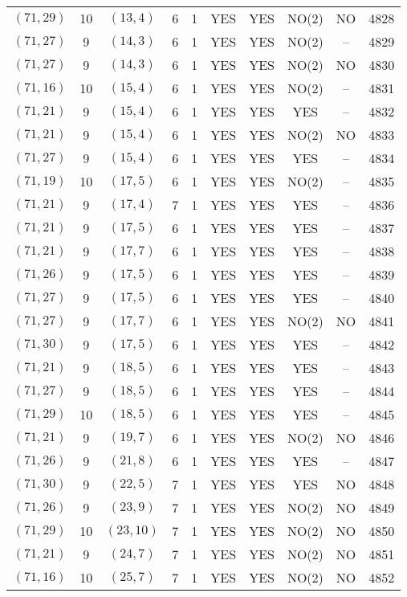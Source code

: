 \begin{longtable}{|c|c|c|c|c|c|c|c|c|c|}
$(71, 29)$ & 10 & $(13, 4)$ & 6 & 1 & YES & YES & NO(2) & NO & 4828\\
$(71, 27)$ & 9 & $(14, 3)$ & 6 & 1 & YES & YES & NO(2) & -- & 4829\\
$(71, 27)$ & 9 & $(14, 3)$ & 6 & 1 & YES & YES & NO(2) & NO & 4830\\
$(71, 16)$ & 10 & $(15, 4)$ & 6 & 1 & YES & YES & NO(2) & -- & 4831\\
$(71, 21)$ & 9 & $(15, 4)$ & 6 & 1 & YES & YES & YES & -- & 4832\\
$(71, 21)$ & 9 & $(15, 4)$ & 6 & 1 & YES & YES & NO(2) & NO & 4833\\
$(71, 27)$ & 9 & $(15, 4)$ & 6 & 1 & YES & YES & YES & -- & 4834\\
$(71, 19)$ & 10 & $(17, 5)$ & 6 & 1 & YES & YES & NO(2) & -- & 4835\\
$(71, 21)$ & 9 & $(17, 4)$ & 7 & 1 & YES & YES & YES & -- & 4836\\
$(71, 21)$ & 9 & $(17, 5)$ & 6 & 1 & YES & YES & YES & -- & 4837\\
$(71, 21)$ & 9 & $(17, 7)$ & 6 & 1 & YES & YES & YES & -- & 4838\\
$(71, 26)$ & 9 & $(17, 5)$ & 6 & 1 & YES & YES & YES & -- & 4839\\
$(71, 27)$ & 9 & $(17, 5)$ & 6 & 1 & YES & YES & YES & -- & 4840\\
$(71, 27)$ & 9 & $(17, 7)$ & 6 & 1 & YES & YES & NO(2) & NO & 4841\\
$(71, 30)$ & 9 & $(17, 5)$ & 6 & 1 & YES & YES & YES & -- & 4842\\
$(71, 21)$ & 9 & $(18, 5)$ & 6 & 1 & YES & YES & YES & -- & 4843\\
$(71, 27)$ & 9 & $(18, 5)$ & 6 & 1 & YES & YES & YES & -- & 4844\\
$(71, 29)$ & 10 & $(18, 5)$ & 6 & 1 & YES & YES & YES & -- & 4845\\
$(71, 21)$ & 9 & $(19, 7)$ & 6 & 1 & YES & YES & NO(2) & NO & 4846\\
$(71, 26)$ & 9 & $(21, 8)$ & 6 & 1 & YES & YES & YES & -- & 4847\\
$(71, 30)$ & 9 & $(22, 5)$ & 7 & 1 & YES & YES & YES & NO & 4848\\
$(71, 26)$ & 9 & $(23, 9)$ & 7 & 1 & YES & YES & NO(2) & NO & 4849\\
$(71, 29)$ & 10 & $(23, 10)$ & 7 & 1 & YES & YES & NO(2) & NO & 4850\\
$(71, 21)$ & 9 & $(24, 7)$ & 7 & 1 & YES & YES & NO(2) & NO & 4851\\
$(71, 16)$ & 10 & $(25, 7)$ & 7 & 1 & YES & YES & NO(2) & NO & 4852\\

\end{longtable}
